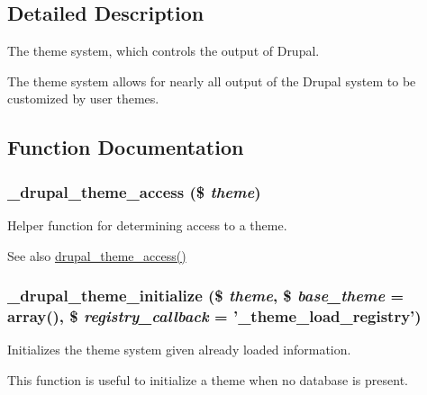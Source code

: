 \subsection{Detailed Description}
The theme system, which controls the output of Drupal.

The theme system allows for nearly all output of the Drupal system to be customized by user themes. 

\subsection{Function Documentation}
\hypertarget{includes_2theme_8inc_a0cdacdc488fa9d7d67b2e7a8c20b9ecc}{
\subsubsection[{\_\-drupal\_\-theme\_\-access}]{\setlength{\rightskip}{0pt plus 5cm}\_\-drupal\_\-theme\_\-access (\$ {\em theme})}}
\label{includes_2theme_8inc_a0cdacdc488fa9d7d67b2e7a8c20b9ecc}
Helper function for determining access to a theme.

\begin{DoxySeeAlso}{See also}
\hyperlink{includes_2theme_8inc_a8585432498ca31ecec1292096a0dce3e}{drupal\_\-theme\_\-access()} 
\end{DoxySeeAlso}
\hypertarget{includes_2theme_8inc_a3fe8f5fcec2fa4c93ee68b59beac38c9}{
\subsubsection[{\_\-drupal\_\-theme\_\-initialize}]{\setlength{\rightskip}{0pt plus 5cm}\_\-drupal\_\-theme\_\-initialize (\$ {\em theme}, \/  \$ {\em base\_\-theme} = {\ttfamily array()}, \/  \$ {\em registry\_\-callback} = {\ttfamily '\_\-theme\_\-load\_\-registry'})}}
\label{includes_2theme_8inc_a3fe8f5fcec2fa4c93ee68b59beac38c9}
Initializes the theme system given already loaded information.

This function is useful to initialize a theme when no database is present.



